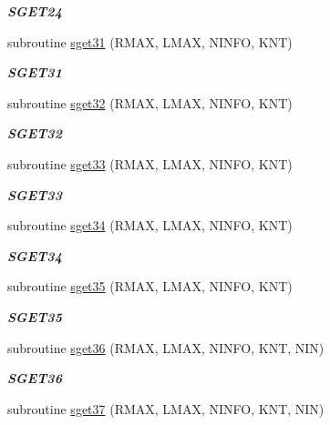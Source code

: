 \begin{DoxyCompactItemize}
\begin{DoxyCompactList}\small\item\em {\bfseries S\+G\+E\+T24} \end{DoxyCompactList}\item 
subroutine \hyperlink{group__single__eig_ga3ecf18b5f5029225a7ddd4a1c42208f2}{sget31} (R\+M\+A\+X, L\+M\+A\+X, N\+I\+N\+F\+O, K\+N\+T)
\begin{DoxyCompactList}\small\item\em {\bfseries S\+G\+E\+T31} \end{DoxyCompactList}\item 
subroutine \hyperlink{group__single__eig_gaed4fdc62ebe7c28b1c0f06c7c7c53850}{sget32} (R\+M\+A\+X, L\+M\+A\+X, N\+I\+N\+F\+O, K\+N\+T)
\begin{DoxyCompactList}\small\item\em {\bfseries S\+G\+E\+T32} \end{DoxyCompactList}\item 
subroutine \hyperlink{group__single__eig_ga3a331380ca2ad1894f1324093ca0b6bc}{sget33} (R\+M\+A\+X, L\+M\+A\+X, N\+I\+N\+F\+O, K\+N\+T)
\begin{DoxyCompactList}\small\item\em {\bfseries S\+G\+E\+T33} \end{DoxyCompactList}\item 
subroutine \hyperlink{group__single__eig_ga982b1b2bcfb91803ffe5fe2c9ed62a19}{sget34} (R\+M\+A\+X, L\+M\+A\+X, N\+I\+N\+F\+O, K\+N\+T)
\begin{DoxyCompactList}\small\item\em {\bfseries S\+G\+E\+T34} \end{DoxyCompactList}\item 
subroutine \hyperlink{group__single__eig_gad00416cde934f3821bd9cbe854ddbd1e}{sget35} (R\+M\+A\+X, L\+M\+A\+X, N\+I\+N\+F\+O, K\+N\+T)
\begin{DoxyCompactList}\small\item\em {\bfseries S\+G\+E\+T35} \end{DoxyCompactList}\item 
subroutine \hyperlink{group__single__eig_ga142bffda1c42659908f951ac51744638}{sget36} (R\+M\+A\+X, L\+M\+A\+X, N\+I\+N\+F\+O, K\+N\+T, N\+I\+N)
\begin{DoxyCompactList}\small\item\em {\bfseries S\+G\+E\+T36} \end{DoxyCompactList}\item 
subroutine \hyperlink{group__single__eig_gac812301fb70fec79ae94eb13b0fa1466}{sget37} (R\+M\+A\+X, L\+M\+A\+X, N\+I\+N\+F\+O, K\+N\+T, N\+I\+N)

\end{DoxyCompactItemize}
